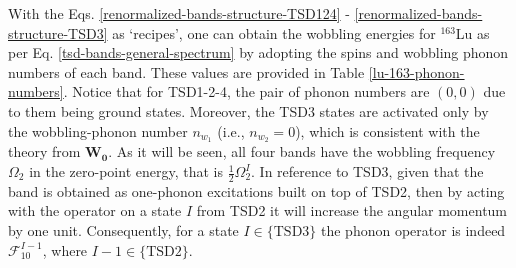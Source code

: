 With the Eqs. \ref{renormalized-bands-structure-TSD124} - \ref{renormalized-bands-structure-TSD3} as `recipes', one can obtain the wobbling energies for $^{163}$Lu as per Eq. \ref{tsd-bands-general-spectrum} by adopting the spins and wobbling phonon numbers of each band. These values are provided in Table \ref{lu-163-phonon-numbers}. Notice that for TSD1-2-4, the pair of phonon numbers are $(0,0)$ due to them being ground states. Moreover, the TSD3 states are activated only by the wobbling-phonon number $n_{w_1}$ (i.e., $n_{w_2}=0$), which is consistent with the theory from $\mathbf{W_0}$. As it will be seen, all four bands have the wobbling frequency $\Omega_2$ in the zero-point energy, that is $\frac{1}{2}\Omega_2^I$. In reference to TSD3, given that the band is obtained as one-phonon excitations built on top of TSD2, then by acting with the operator on a state $I$ from TSD2 it will increase the angular momentum by one unit. Consequently, for a state $I\in\{\text{TSD3}\}$ the phonon operator is indeed $\mathcal{F}_{10}^{I-1}$, where $I-1\in\{\text{TSD2}\}$.
\begin{table}
    \centering
    \caption{The wobbling phonon numbers $(n_{w_1},n_{w_2}$) and the phonon term $\mathcal{F}_{n_{w_1}n_{w_2}}^I$ are provided in the first three columns for $^{163}$Lu. The first ($I_0$) and terminus ($I_t$) states of each band are given in the next two columns. Last column contains the quasi-particles involved in the particle + rotor coupling, which are denoted according to Eqs. \ref{renormalized-bands-structure-TSD124} - \ref{renormalized-bands-structure-TSD3}.}
    \label{lu-163-phonon-numbers}
\end{table}


